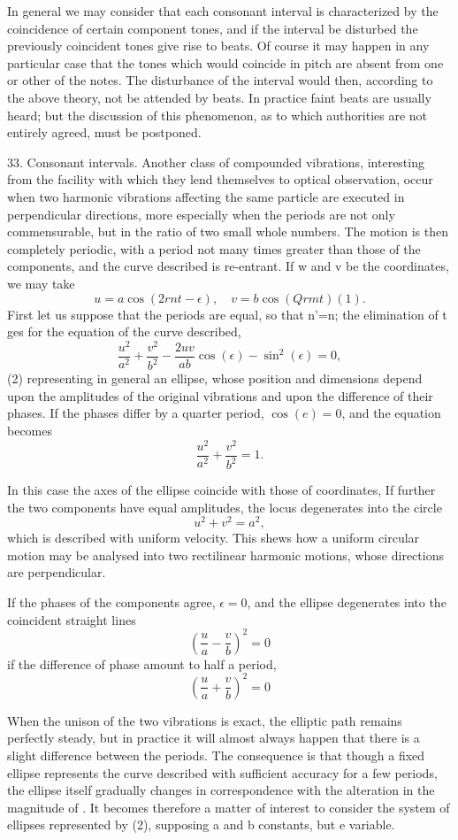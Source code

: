 In general we may consider that each consonant interval is characterized
by the coincidence of certain component tones, and if the interval be
disturbed the previously coincident tones give rise to beats. Of course
it may happen in any particular case that the tones which would coincide in
pitch are absent from one or other of the notes. The disturbance of the
interval would then, according to the above theory, not be attended by beats.
In practice faint beats are usually heard; but the discussion of this
phenomenon, as to which authorities are not entirely agreed, must be postponed.

33. Consonant intervals. Another class of compounded vibrations, interesting
from the facility with which they lend themselves to optical observation, occur
when two harmonic vibrations affecting the same particle are executed in
perpendicular directions, more especially when the periods are not only
commensurable, but in the ratio of two small whole numbers. The motion is then
completely periodic, with a period not many times greater than those of the
components, and the curve described is re-entrant. If w and v be the
coordinates, we may take
\[u=a \cos(2rnt-\epsilon), \quad v=b \cos(Qrm t) (1).\]
First let us suppose that the periods are equal, so that n'=n; the elimination
of t ges for the equation of the curve described,
\[\frac{u^2}{a^2}+\frac{v^2}{b^2}-\frac{2uv}{ab}\cos(\epsilon)-\sin^2(\epsilon)=0,\]
(2) representing in general an ellipse, whose position and dimensions depend
upon the amplitudes of the original vibrations and upon the difference of their
phases. If the phases differ by a quarter period, \(\cos(e)=0\), and the equation becomes
\[ \frac{u^2}{a^2} +  \frac{v^2}{b^2} =1.  \]

In this case the axes of the ellipse coincide with those of coordinates, If
further the two components have equal amplitudes, the locus degenerates into
the circle
\[ u^2 +  v^2 = a^2,\]
which is described with uniform velocity.
This shews how a uniform circular motion may be analysed into two rectilinear
harmonic motions, whose directions are perpendicular.

If the phases of the components agree, \(\epsilon = 0\), and the ellipse
degenerates into the coincident straight lines
\[ \left( \frac{u}{a} - \frac{v}{b}\right)^2 = 0 \]
if the difference of phase amount to half a period,
\[ \left( \frac{u}{a} + \frac{v}{b}\right)^2 = 0 \]

When the unison of the two vibrations is exact, the elliptic path remains
perfectly steady, but in practice it will almost always happen that there is a
slight difference between the periods. The consequence is that though a fixed
ellipse represents the curve described with sufficient accuracy for a few
periods, the ellipse itself gradually changes in correspondence with the
alteration in the magnitude of . It becomes therefore a matter of interest to
consider the system of ellipses represented by (2), supposing a and b
constants, but e variable.

